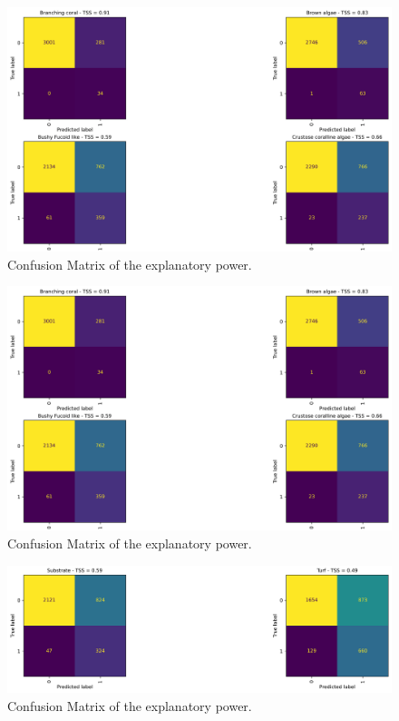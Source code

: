 \begin{figure}
\ContinuedFloat
\centering
\includegraphics{03-Chapitre3/figures/supplementary/03-confusion_matrix_train_all_b.png}
\caption{Confusion Matrix of the explanatory
power.}
\end{figure}
\begin{figure}
\ContinuedFloat
\centering
\includegraphics{03-Chapitre3/figures/supplementary/03-confusion_matrix_train_all_c.png}
\caption{Confusion Matrix of the explanatory
power.}
\end{figure}
\begin{figure}
\ContinuedFloat
\centering
\includegraphics{03-Chapitre3/figures/supplementary/03-confusion_matrix_train_all_d.png}
\caption{Confusion Matrix of the explanatory
power.}
\end{figure}


